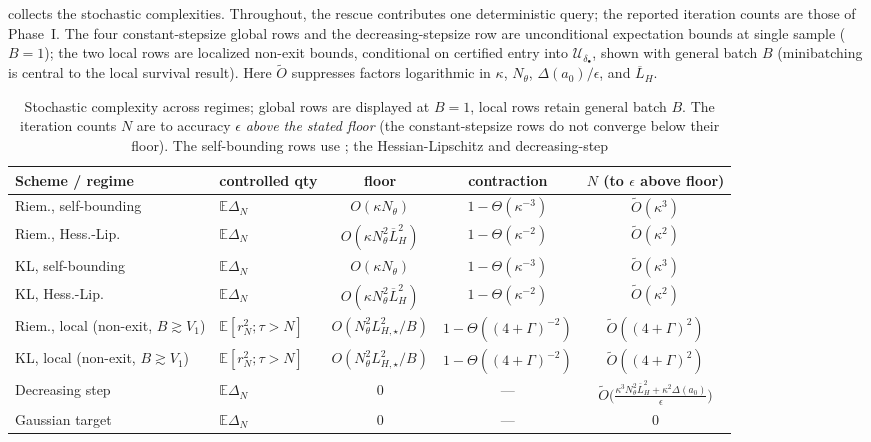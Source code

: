 \documentclass[11pt]{article}
\theoremstyle{plain}
\theoremstyle{definition}
\theoremstyle{remark}
\newcommand{\E}{\mathbb{E}}
\newcommand{\barLH}{\overline{L}_H}
\newcommand{\Ureg}{\mathcal{U}}
\newcommand{\LHs}{L_{H,\star}}
\begin{document}
 collects the stochastic complexities. Throughout, the rescue contributes one
deterministic query; the reported iteration counts are those of Phase~I. The four constant-stepsize
global rows and the decreasing-stepsize row are unconditional expectation bounds at single sample
($B=1$); the two local rows are localized non-exit bounds, conditional on certified entry into
$\Ureg_{\delta_\bullet}$, shown with general batch $B$ (minibatching is central to the local survival
result). Here $\widetilde O$ suppresses factors logarithmic in $\kappa$, $N_\theta$,
$\Delta(a_0)/\epsilon$, and $\barLH$.

\begin{table}[t]
\centering
\small
\begin{tabular}{llccc}
\hline
Scheme / regime & controlled qty & floor & contraction & $N$ (to $\epsilon$ above floor) \\
\hline
Riem., self-bounding & $\E\Delta_N$ & $O(\kappa N_\theta)$ & $1-\Theta(\kappa^{-3})$ & $\widetilde O(\kappa^3)$ \\
Riem., Hess.-Lip. & $\E\Delta_N$ & $O(\kappa N_\theta^2\barLH^2)$ & $1-\Theta(\kappa^{-2})$ & $\widetilde O(\kappa^2)$ \\
KL, self-bounding & $\E\Delta_N$ & $O(\kappa N_\theta)$ & $1-\Theta(\kappa^{-3})$ & $\widetilde O(\kappa^3)$ \\
KL, Hess.-Lip. & $\E\Delta_N$ & $O(\kappa N_\theta^2\barLH^2)$ & $1-\Theta(\kappa^{-2})$ & $\widetilde O(\kappa^2)$ \\
\hline
Riem., local (non-exit, $B{\gtrsim}V_1$) & $\E[r_N^2;\tau{>}N]$ & $O(N_\theta^2\LHs^2/B)$ & $1-\Theta((4+\Gamma)^{-2})$ & $\widetilde O((4+\Gamma)^2)$ \\
KL, local (non-exit, $B{\gtrsim}V_1$) & $\E[r_N^2;\tau{>}N]$ & $O(N_\theta^2\LHs^2/B)$ & $1-\Theta((4+\Gamma)^{-2})$ & $\widetilde O((4+\Gamma)^2)$ \\
\hline
Decreasing step & $\E\Delta_N$ & $0$ & --- & $\widetilde O\!\bigl(\tfrac{\kappa^3N_\theta^2\barLH^2+\kappa^2\Delta(a_0)}{\epsilon}\bigr)$ \\
Gaussian target & $\E\Delta_N$ & $0$ & --- & $0$ \\
\hline
\end{tabular}
\caption{Stochastic complexity across regimes; global rows are displayed at $B=1$, local rows retain
general batch $B$. The
iteration counts $N$ are to accuracy $\epsilon$ \emph{above the stated floor} (the constant-stepsize
rows do not converge below their floor). The
self-bounding rows use ; the Hessian-Lipschitz and decreasing-step
}
\end{table}
\end{document}
